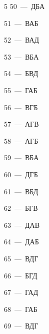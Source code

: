 \documentclass[12pt]{article}
\begin{document}
\begin{multicols}{5}
\mbox{50~--- ДБА}\par
\mbox{51~--- ВАБ}\par
\mbox{52~--- ВАД}\par
\mbox{53~--- ВБА}\par
\mbox{54~--- БВД}\par
\mbox{55~--- ГАБ}\par
\mbox{56~--- ВГБ}\par
\mbox{57~--- АГВ}\par
\mbox{58~--- АГБ}\par
\mbox{59~--- ВБА}\par
\mbox{60~--- ДГБ}\par
\mbox{61~--- ВБД}\par
\mbox{62~--- БГВ}\par
\mbox{63~--- ДАВ}\par
\mbox{64~--- ДАБ}\par
\mbox{65~--- ВДГ}\par
\mbox{66~--- БГД}\par
\mbox{67~--- ГАД}\par
\mbox{68~--- ГАБ}\par
\mbox{69~--- ВДГ}
\end{multicols}\par\vspace{0.2cm}
\end{document}
